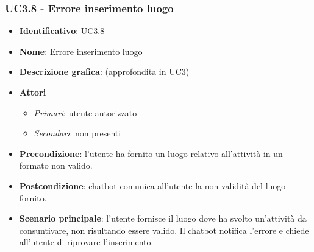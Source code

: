 \subsubsection{UC3.8 - Errore inserimento luogo}
\begin{itemize}
    \item \textbf{Identificativo}: UC3.8
    \item \textbf{Nome}: Errore inserimento luogo
    \item \textbf{Descrizione grafica}: (approfondita in UC3)
    \item \textbf{Attori}
        \begin{itemize} 
            \item \textit{Primari}: utente autorizzato
            \item \textit{Secondari}: non presenti
        \end{itemize}
    \item \textbf{Precondizione}: l'utente ha fornito un luogo relativo all'attività in un formato non valido. 
    \item \textbf{Postcondizione}: chatbot comunica all'utente la non validità del luogo fornito.
    \item \textbf{Scenario principale}: l'utente fornisce il luogo dove ha svolto un'attività da consuntivare, non risultando essere valido. Il chatbot notifica l'errore e chiede all'utente di riprovare l'inserimento. 
\end{itemize}
\newpage